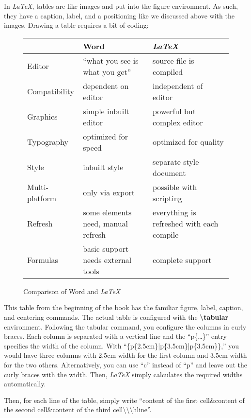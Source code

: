 In \textit{LaTeX}, tables are like images and put into the figure environment. As such, they have a caption, label, and a positioning like we discussed above with the images. Drawing a table requires a bit of coding:
\begin{figure}[H]\centering
\begin{tabular}{p{2.5cm}|p{3.5cm}|p{3.5cm}}
\hline
&\textbf{Word}&\textbf{\textit{LaTeX}}\\
\hline
Editor&``what you see is what you get''&source file is compiled\\
\hline
Compatibility&dependent on editor&independent of editor\\
\hline
Graphics&simple inbuilt editor&powerful but complex editor\\
\hline
Typography&optimized for speed&optimized for quality\\
\hline
Style&inbuilt style&separate style document\\
\hline
Multi-platform&only via export&possible with scripting\\
\hline
Refresh&some elements need, manual refresh&everything is refreshed with each compile\\
\hline
Formulas&basic support needs external tools&complete support\\
\hline

\end{tabular}
\caption{Comparison of Word and \textit{LaTeX}}
\label{c1_comparisonwordlatex:fig}
\end{figure}

This table from the beginning of the book has the familiar figure, label, caption, and centering commands. The actual table is configured with the \textbf{\textbackslash tabular} environment. Following the tabular command, you configure the columns in curly braces. Each column is separated with a vertical line and the ``p\{\dots\}'' entry specifies the width of the column. With ``\{p\{2.5cm\}|p\{3.5cm\}|p\{3.5cm\}\},'' you would have three columns with 2.5cm width for the first column and 3.5cm width for the two others. Alternatively, you can use ``c'' instead of ``p'' and leave out the curly braces with the width. Then, \textit{LaTeX} simply calculates the required widths automatically.

Then, for each line of the table, simply write ``content of the first cell\&content of the second cell\&content of the third cell\textbackslash\textbackslash\textbackslash hline''.


